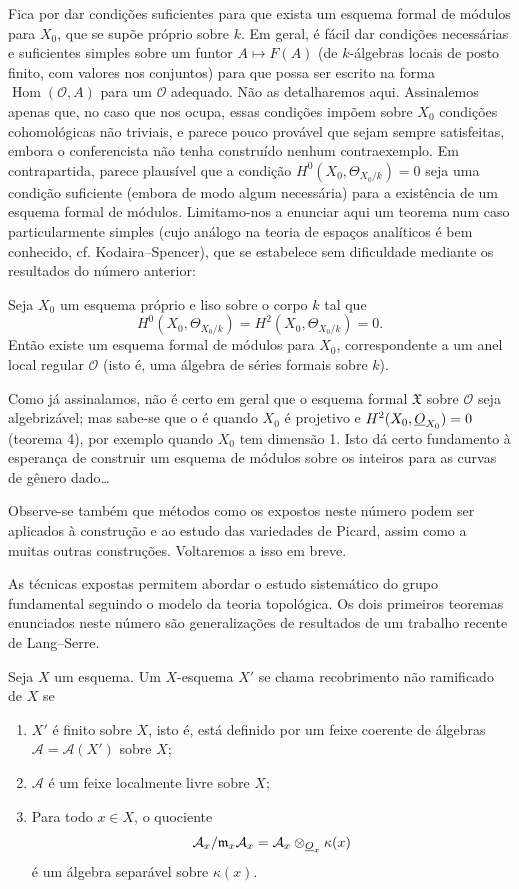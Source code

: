 Fica por dar condições suficientes para que exista um esquema formal de
módulos para $X_0$, que se supõe próprio sobre $k$. Em geral, é fácil dar
condições necessárias e suficientes simples sobre um funtor
$A\longmapsto F(A)$ (de $k$-álgebras locais de posto finito, com valores nos
conjuntos) para que possa ser escrito na forma
$\operatorname{Hom}(\mathcal O,A)$ para um $\mathcal O$ adequado. Não as
detalharemos aqui. Assinalemos apenas que, no caso que nos ocupa, essas
condições impõem sobre $X_0$ condições cohomológicas não triviais, e parece
pouco provável que sejam sempre satisfeitas, embora o conferencista não tenha
construído nenhum contraexemplo. Em contrapartida, parece plausível que a condição
$H^0(X_0,\Theta_{X_0/k})=0$ seja uma condição suficiente (embora de modo algum
necessária) para a existência de um esquema formal de módulos. Limitamo-nos a
enunciar aqui um teorema num caso particularmente simples (cujo análogo na
teoria de espaços analíticos é bem conhecido, cf. Kodaira--Spencer), que se
estabelece sem dificuldade mediante os resultados do número anterior:

 Seja $X_0$ um esquema próprio e liso sobre o corpo $k$
tal que
\[
  H^0(X_0,\Theta_{X_0/k})=H^2(X_0,\Theta_{X_0/k})=0.
\]
Então existe um esquema formal de módulos para $X_0$, correspondente a um
anel local regular $\mathcal O$ (isto é, uma álgebra de séries formais sobre
$k$).

Como já assinalamos, não é certo em geral que o esquema formal
$\mathfrak X$ sobre $\mathcal O$ seja algebrizável; mas sabe-se que o é
quando $X_0$ é projetivo e $H^2(X_0,\underline{O}_{X_0})=0$ (teorema 4), por exemplo
quando $X_0$ tem dimensão 1. Isto dá certo fundamento à esperança de
construir um esquema de módulos sobre os inteiros para as curvas de gênero
dado\ldots{}

Observe-se também que métodos como os expostos neste número podem ser aplicados
à construção e ao estudo das variedades de Picard, assim como a muitas
outras construções. Voltaremos a isso em breve.


As técnicas expostas permitem abordar o estudo sistemático do grupo
fundamental seguindo o modelo da teoria topológica. Os dois primeiros
teoremas enunciados neste número são generalizações de resultados de um
trabalho recente de Lang--Serre.

Seja $X$ um esquema. Um $X$-esquema $X'$ se chama recobrimento não ramificado de
$X$ se
\begin{enumerate}
  \item[\textit{i.}] $X'$ é finito sobre $X$, isto é, está definido por um
    feixe coerente de álgebras $\mathcal A=\mathcal A(X')$ sobre $X$;
  \item[\textit{ii.}] $\mathcal A$ é um feixe localmente livre sobre $X$;
  \item[\textit{iii.}] Para todo $x\in X$, o quociente
    \[
      \mathcal A_x/\mathfrak m_x\mathcal A_x
      =\mathcal A_x\otimes_{\underline{O}_x}\kappa(x)
    \]
    é um álgebra separável sobre $\kappa(x)$.
\end{enumerate}

